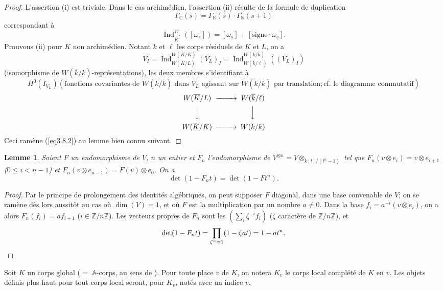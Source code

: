 \documentclass[11pt,a4paper]{amsart}
\theoremstyle{plain}
\newtheorem{lemma}[theorem]{Lemme}
\theoremstyle{definition}
\DeclareMathOperator{\Ind}{Ind}
\newcommand{\dbZ}{\mathbb{Z}}
\newcommand{\dbR}{\mathbb{R}}
\newcommand{\dbC}{\mathbb{C}}
\newcommand{\dbA}{\mathbb{A}}
\def\dim{\mathop{\mathrm{dim}}\nolimits}
\newenvironment{para}{\par\noindent}{\par}
\newcommand{\ov}[1]{\overline{#1}}
\begin{document}
\begin{proof}
L'assertion (i) est triviale. Dans le cas archim\'edien, l'assertion (ii) r\'esulte de la formule de duplication
\[
\Gamma_{\dbC}(s) = \Gamma_{\dbR}(s) \cdot \Gamma_{\dbR}(s+1)
\]
correspondant \`a
\[
\Ind_{\ov{K}^{*}}^{W}([\omega_{s}]) = [\omega_{s}] + [\text{signe} \cdot \omega_{s}].
\]
Prouvons (ii) pour $K$ non archim\'edien. Notant $k$ et $\ell$ les corps r\'esiduels de $K$ et $L$, on a
\[
V_{I} = \Ind_{W(\ov{K}/L)}^{W(\ov{K}/K)}(V_{L})_{I} = \Ind_{W(\ov{k}/\ell)}^{W(\ov{k}/k)}((V_{L})_{I})
\]
(isomorphisme de $W(\ov{k}/k)$-repr\'esentations), les deux membres s'identifiant \`a
\[
H^{0}(I_{V_{L}})(\text{fonctions covariantes de } W(\ov{k}/k) \text{ dans } V_{L} \text{ agissant sur } W(\ov{k}/k) \text{ par translation}; \text{cf.~le diagramme commutatif})
\]
\[
\begin{CD}
W(\ov{K}/L) @>>> W(\ov{k}/\ell) \\
@VVV @VVV \\
W(\ov{K}/K) @>>> W(\ov{k}/k)
\end{CD}
\]
Ceci ram\`ene (\ref{eq3.8.2}) au lemme bien connu suivant.
\end{proof}

\begin{lemma}\label{lem3.9}
Soient $F$ un endomorphisme de $V$, $n$ un entier et $F_{n}$ l'endomorphisme de $V^{\otimes n} = V \otimes_{k[t]/(t^{n}-1)}$ tel que $F_{n}(v \otimes e_{i}) = v \otimes e_{i+1}$ ($0 \leq i < n-1$) et $F_{n}(v \otimes e_{n-1}) = F(v) \otimes e_{0}$. On a
\[
\det(1 - F_{n}t) = \det(1 - Ft^{n}).
\]
\end{lemma}

\begin{proof}
Par le principe de prolongement des identit\'es alg\'ebriques, on peut supposer $F$ diagonal, dans une base convenable de $V$; on se ram\`ene d\`es lors aussit\^ot au cas o\`u $\dim(V) = 1$, et o\`u $F$ est la multiplication par un nombre $a \not= 0$. Dans la base $f_{i} = a^{-i}(v \otimes e_{i})$, on a alors $F_{n}(f_{i}) = a f_{i+1}$ ($i \in \dbZ/n\dbZ$). Les vecteurs propres de $F_{n}$ sont les $(\sum_{i} \zeta^{-i} f_{i})$ ($\zeta$ caract\`ere de $\dbZ/n\dbZ$), et
\[
\det(1 - F_{n}t) = \prod_{\zeta^{n}=1} (1 - \zeta a t) = 1 - at^{n}. \qedhere
\]
\end{proof}

\begin{para}
Soit $K$ un corps global ($=$ $\dbA$-corps, au sens de \cite{15}). Pour toute place $v$ de $K$, on notera $K_{v}$ le corps local compl\'et\'e de $K$ en $v$. Les objets d\'efinis plus haut pour tout corps local seront, pour $K_{v}$, not\'es avec un indice $v$.
\end{para}
\end{document}
